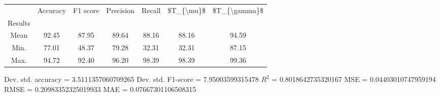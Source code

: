\begin{tabular}{|c|c|c|c|c|c|c|}
\toprule
{} &  Accuracy &  F1 score &  Precision &  Recall &  \$T\_\{\textbackslash mu\}\$ &  \$T\_\{\textbackslash gamma\}\$ \\
Results &           &           &            &         &            &               \\
\hline
Mean    &     92.45 &     87.95 &      89.64 &   88.16 &      88.16 &         94.59 \\
Min.    &     77.01 &     48.37 &      79.28 &   32.31 &      32.31 &         87.15 \\
Max.    &     94.72 &     92.40 &      96.20 &   98.39 &      98.39 &         99.36 \\
\bottomrule
\end{tabular}

 Dev. std. accuracy = 3.5111357060709265
 Dev. std. F1-score = 7.95003599315478
 $R^2$ = 0.8018642735320167
 MSE = 0.04403010747959194
 RMSE = 0.20983352325019933
 MAE = 0.07667301106508315